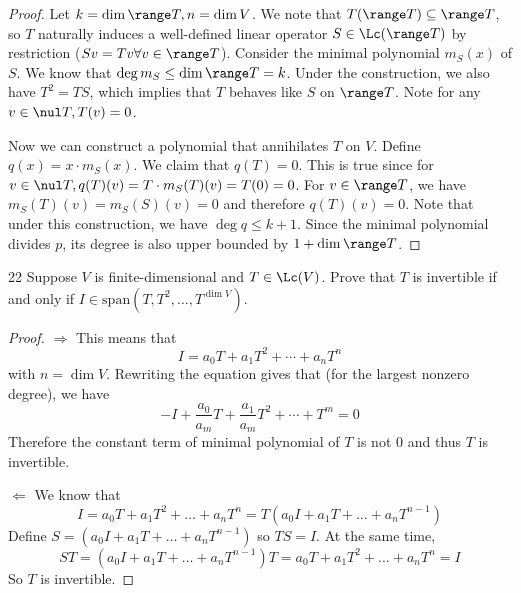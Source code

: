 \documentclass{extarticle}
\begin{document}
\begin{proof}
Let \(k = \dim \range T, n = \dim V\). We note that \(T(\range T) \subseteq \range T\), so \(T\)
naturally induces a well-defined linear operator \(S \in \Lc(\range T)\) by restriction (\(Sv=Tv \forall  v 
\in \range T\)). Consider the minimal polynomial \(m_S(x)\) of \(S\). We know that \(\deg m_S \leq \dim 
\range T = k\). Under the construction, we also have \(T^2 = TS\), which implies that \(T\) behaves like 
\(S\) on \(\range T\). Note for any \(v \in \nul T, T(v) = 0\). 

Now we can construct a polynomial that annihilates \(T\) on \(V\). Define \(q(x) = x \cdot m_S(x)\). We 
claim that \(q(T) = 0\). This is true since for \(v \in \nul T, q(T)(v) = T \cdot m_S(T)(v) = T(0) = 0\). 
For \(v \in \range T\), we have \(m_S(T)(v) = m_S(S)(v) = 0\) and therefore \(q(T)(v) = 0\). Note that 
under this construction, we have \(\deg q \leq k + 1\). Since the minimal polynomial divides \(p\), its 
degree is also upper bounded by \(1 + \dim \range T\). 


\end{proof}

\begin{problem}{22}
    Suppose \(V\) is finite-dimensional and \(T \in \Lc(V)\). Prove that \(T\) is invertible if and only 
    if \(I \in \text{span}(T, T^2, \ldots, T^{\dim V})\). 
\end{problem}

\begin{proof}
\(\Rightarrow\) This means that 
\[I = a_0 T + a_1 T^2 + \cdots + a_n T^n\]
with \(n = \dim V\). Rewriting the equation gives that (for the largest nonzero degree), we have 
\[-I + \frac{a_0}{a_m}T + \frac{a_1}{a_m}T^2 + \cdots + T^m = 0\]
Therefore the constant term of minimal polynomial of \(T\) is not 0 and thus \(T\) is invertible. 


\(\Leftarrow\) We know that 
\[I = a_0 T + a_1 T^2 + \ldots + a_n T^n = T(a_0 I + a_1 T + \ldots + a_nT^{n-1})\]
Define \(S = (a_0 I + a_1 T + \ldots + a_nT^{n-1})\) so \(TS = I\). At the same time,
\[ST = (a_0 I + a_1 T + \ldots + a_n T^{n-1})T = a_0 T + a_1 T^2 + \ldots + a_n T^n 
= I\]
So \(T\) is invertible. 
\end{proof}
\end{document}
